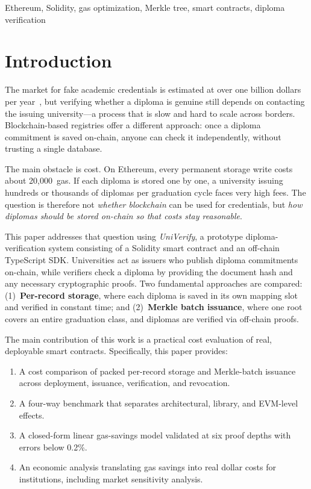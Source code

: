 \documentclass[conference]{IEEEtran}
\begin{document}
\begin{IEEEkeywords}
Ethereum, Solidity, gas optimization, Merkle tree,
smart contracts, diploma verification
\end{IEEEkeywords}

\section{Introduction}
\label{sec:intro}

The market for fake academic credentials is estimated
at over one billion dollars per year~\cite{ezell2012degree}, 
but verifying whether a diploma is genuine still depends on 
contacting the issuing university---a process that is slow and 
hard to scale across borders. Blockchain-based registries offer 
a different approach: once a diploma commitment is saved on-chain, 
anyone can check it independently, without trusting a single database.

The main obstacle is cost. On Ethereum, every permanent storage 
write costs about 20{,}000~gas. If each diploma is stored one by one, 
a university issuing hundreds or thousands of diplomas per graduation 
cycle faces very high fees. The question is therefore not \emph{whether 
blockchain} can be used for credentials, but \emph{how diplomas 
should be stored on-chain so that costs stay reasonable}.

This paper addresses that question using \emph{UniVerify}, a prototype 
diploma-verification system consisting of a Solidity smart contract and 
an off-chain TypeScript SDK. Universities act as issuers who publish 
diploma commitments on-chain, while verifiers check a diploma by providing 
the document hash and any necessary cryptographic proofs. Two fundamental 
approaches are compared: (1)~\textbf{Per-record storage}, where each 
diploma is saved in its own mapping slot and verified in constant time; 
and (2)~\textbf{Merkle batch issuance}, where one root covers an entire 
graduation class, and diplomas are verified via off-chain proofs.

The main contribution of this work is a practical cost evaluation of 
real, deployable smart contracts. Specifically, this paper provides:
\begin{enumerate}
  \item A cost comparison of packed per-record storage and Merkle-batch 
        issuance across deployment, issuance, verification, and revocation.
  \item A four-way benchmark that separates architectural, library, 
        and EVM-level effects.
  \item A closed-form linear gas-savings model validated at six proof 
        depths with errors below 0.2\%.
  \item An economic analysis translating gas savings into real dollar 
        costs for institutions, including market sensitivity analysis.
\end{enumerate}
\end{document}
